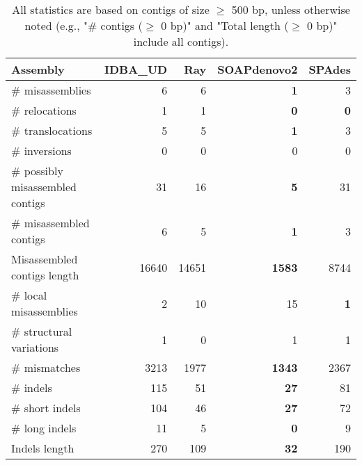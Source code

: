 \documentclass[12pt,a4paper]{article}
\begin{document}
\begin{table}[ht]
\begin{center}
\caption{All statistics are based on contigs of size $\geq$ 500 bp, unless otherwise noted (e.g., "\# contigs ($\geq$ 0 bp)" and "Total length ($\geq$ 0 bp)" include all contigs).}
\begin{tabular}{|l*{4}{|r}|}
\hline
Assembly & IDBA\_UD & Ray & SOAPdenovo2 & SPAdes \\ \hline
\# misassemblies & 6 & 6 & {\bf 1} & 3 \\ \hline
\hspace{5mm}\# relocations & 1 & 1 & {\bf 0} & {\bf 0} \\ \hline
\hspace{5mm}\# translocations & 5 & 5 & {\bf 1} & 3 \\ \hline
\hspace{5mm}\# inversions & 0 & 0 & 0 & 0 \\ \hline
\# possibly misassembled contigs & 31 & 16 & {\bf 5} & 31 \\ \hline
\# misassembled contigs & 6 & 5 & {\bf 1} & 3 \\ \hline
Misassembled contigs length & 16640 & 14651 & {\bf 1583} & 8744 \\ \hline
\# local misassemblies & 2 & 10 & 15 & {\bf 1} \\ \hline
\# structural variations & 1 & 0 & 1 & 1 \\ \hline
\# mismatches & 3213 & 1977 & {\bf 1343} & 2367 \\ \hline
\# indels & 115 & 51 & {\bf 27} & 81 \\ \hline
\hspace{5mm}\# short indels & 104 & 46 & {\bf 27} & 72 \\ \hline
\hspace{5mm}\# long indels & 11 & 5 & {\bf 0} & 9 \\ \hline
Indels length & 270 & 109 & {\bf 32} & 190 \\ \hline
\end{tabular}
\end{center}
\end{table}
\end{document}
